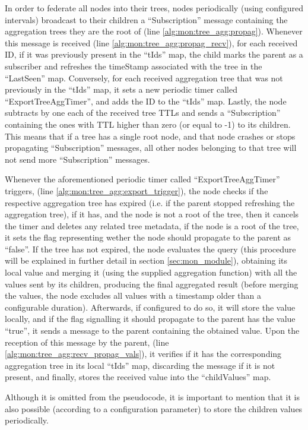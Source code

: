 In order to federate all nodes into their trees, nodes periodically (using configured intervals) broadcast to their children a ``Subscription'' message containing the aggregation trees they are the root of (line \ref{alg:mon:tree_agg:propag}). Whenever this message is received (line \ref{alg:mon:tree_agg:propag_recv}), for each received ID, if it was previously present in the ``tIds'' map, the child marks the parent as a subscriber and refreshes the timeStamp associated with the tree in the ``LastSeen'' map. Conversely, for each received aggregation tree that was not previously in the ``tIds'' map, it sets a new periodic timer called ``ExportTreeAggTimer'', and adds the ID to the ``tIds'' map. Lastly, the node subtracts by one each of the received tree TTLs and sends a ``Subscription'' containing the ones with TTL higher than zero (or equal to -1) to its children. This means that if a tree has a single root node, and that node crashes or stops propagating ``Subscription'' messages, all other nodes belonging to that tree will not send more ``Subscription'' messages.

Whenever the aforementioned periodic timer called ``ExportTreeAggTimer'' triggers, (line \ref{alg:mon:tree_agg:export_trigger}), the node checks if the respective aggregation tree has expired (i.e. if the parent stopped refreshing the aggregation tree), if it has, and the node is not a root of the tree, then it cancels the timer and deletes any related tree metadata, if the node is a root of the tree, it sets the flag representing wether the node should propagate to the parent as ``false''. If the tree has not expired, the node evaluates the query (this procedure will be explained in further detail in section \ref{sec:mon_module}), obtaining its local value and merging it (using the supplied aggregation function) with all the values sent by its children, producing the final aggregated result (before merging the values, the node excludes all values with a timestamp older than a configurable duration). Afterwards, if configured to do so, it will store the value locally, and if the flag signalling it should propagate to the parent has the value ``true'', it sends a message to the parent containing the obtained value. Upon the reception of this message by the parent, (line \ref{alg:mon:tree_agg:recv_propag_vals}), it verifies if it has the corresponding aggregation tree in its local ``tIds'' map, discarding the message if it is not present, and finally, stores the received value into the ``childValues'' map.

Although it is omitted from the pseudocode, it is important to mention that it is also possible (according to a configuration parameter) to store the children values periodically.

